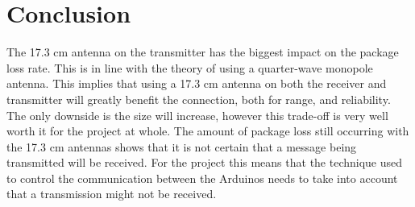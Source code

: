 \section*{Conclusion}
The 17.3 cm antenna on the transmitter has the biggest impact on the package loss rate.
This is in line with the theory of using a quarter-wave monopole antenna.
This implies that using a 17.3 cm antenna on both the receiver and transmitter will greatly benefit the connection, both for range, and reliability.
The only downside is the size will increase, however this trade-off is very well worth it for the project at whole.
The amount of package loss still occurring with the 17.3 cm antennas shows that it is not certain that a message being transmitted will be received.
For the project this means that the technique used to control the communication between the Arduinos needs to take into account that a transmission might not be received.
